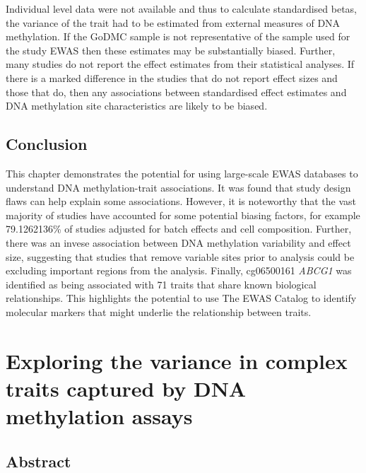 \documentclass[11pt,oneside]{bristolthesis}
\begin{document}
Individual level data were not available and thus to calculate standardised betas, the variance of the trait had to be estimated from external measures of DNA methylation. If the GoDMC sample is not representative of the sample used for the study EWAS then these estimates may be substantially biased. Further, many studies do not report the effect estimates from their statistical analyses. If there is a marked difference in the studies that do not report effect sizes and those that do, then any associations between standardised effect estimates and DNA methylation site characteristics are likely to be biased.

\hypertarget{conclusion-04}{%
\section{Conclusion}\label{conclusion-04}}

This chapter demonstrates the potential for using large-scale EWAS databases to understand DNA methylation-trait associations. It was found that study design flaws can help explain some associations. However, it is noteworthy that the vast majority of studies have accounted for some potential biasing factors, for example 79.1262136\% of studies adjusted for batch effects and cell composition. Further, there was an invese association between DNA methylation variability and effect size, suggesting that studies that remove variable sites prior to analysis could be excluding important regions from the analysis. Finally, cg06500161 \emph{ABCG1} was identified as being associated with 71 traits that share known biological relationships. This highlights the potential to use The EWAS Catalog to identify molecular markers that might underlie the relationship between traits.

\hypertarget{h2ewas-chapter}{%
\chapter{Exploring the variance in complex traits captured by DNA methylation assays}\label{h2ewas-chapter}}

\hypertarget{abstract-05}{%
\section{Abstract}\label{abstract-05}}
\end{document}
